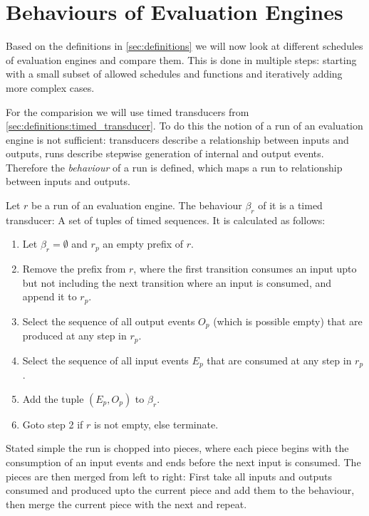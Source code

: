 \chapter{Behaviours of Evaluation Engines}
\label{sec:behaviours}

Based on the definitions in \cref{sec:definitions} we will now look at different schedules of evaluation engines and compare them.
This is done in multiple steps: starting with a small subset of allowed schedules and functions and iteratively adding more complex cases.

For the comparision we will use timed transducers from \cref{sec:definitions:timed_transducer}.
To do this the notion of a run of an evaluation engine is not sufficient: transducers describe a relationship between inputs and outputs, runs describe stepwise generation of internal and output events.
Therefore the \emph{behaviour} of a run is defined, which maps a run to relationship between inputs and outputs.

\begin{definition}[name = Behaviour of a Run]\label{def:behaviour_run}
  Let \(r\) be a run of an evaluation engine.
  The behaviour \(\beta_r\) of it is a timed transducer: A set of tuples of timed sequences.
  It is calculated as follows:
  \begin{enumerate}
    \item Let \(\beta_r = \emptyset\) and \(r_p\) an empty prefix of \(r\).
    \item Remove the prefix  from \(r\), where the first transition consumes an input upto but not including the next transition where an input is consumed, and append it to \(r_p\).
    \item Select the sequence of all output events \(O_p\) (which is possible empty) that are produced at any step in \(r_p\).
    \item Select the sequence of all input events \(E_p\) that are consumed at any step in \(r_p\).
    \item Add the tuple \((E_p,O_p)\) to \(\beta_r\).
    \item Goto step 2 if \(r\) is not empty, else terminate.
  \end{enumerate}

  Stated simple the run is chopped into pieces, where each piece begins with the consumption of an input events and ends before the next input is consumed.
  The pieces are then merged from left to right: First take all inputs and outputs consumed and produced upto the current piece and add them to the behaviour, then merge the current piece with the next and repeat.
\end{definition}

